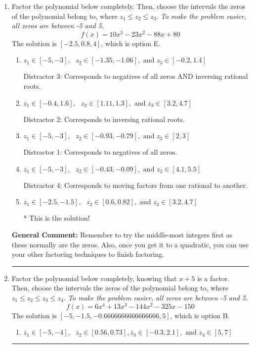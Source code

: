 \documentclass{extbook}[14pt]
\newcommand{\litem}[1]{\item #1

\rule{\textwidth}{0.4pt}}
\begin{document}
\begin{enumerate}\litem{
Factor the polynomial below completely. Then, choose the intervals the zeros of the polynomial belong to, where $z_1 \leq z_2 \leq z_3$. \textit{To make the problem easier, all zeros are between -5 and 5.}
\[ f(x) = 10x^{3} -23 x^{2} -88 x + 80 \]The solution is \( [-2.5, 0.8, 4] \), which is option E.\begin{enumerate}[label=\Alph*.]
\item \( z_1 \in [-5, -3], \text{   }  z_2 \in [-1.35, -1.06], \text{   and   } z_3 \in [-0.2, 1.4] \)

 Distractor 3: Corresponds to negatives of all zeros AND inversing rational roots.
\item \( z_1 \in [-0.4, 1.6], \text{   }  z_2 \in [1.11, 1.3], \text{   and   } z_3 \in [3.2, 4.7] \)

 Distractor 2: Corresponds to inversing rational roots.
\item \( z_1 \in [-5, -3], \text{   }  z_2 \in [-0.93, -0.79], \text{   and   } z_3 \in [2, 3] \)

 Distractor 1: Corresponds to negatives of all zeros.
\item \( z_1 \in [-5, -3], \text{   }  z_2 \in [-0.43, -0.09], \text{   and   } z_3 \in [4.1, 5.5] \)

 Distractor 4: Corresponds to moving factors from one rational to another.
\item \( z_1 \in [-2.5, -1.5], \text{   }  z_2 \in [0.6, 0.82], \text{   and   } z_3 \in [3.2, 4.7] \)

* This is the solution!
\end{enumerate}

\textbf{General Comment:} Remember to try the middle-most integers first as these normally are the zeros. Also, once you get it to a quadratic, you can use your other factoring techniques to finish factoring.
}
\litem{
Factor the polynomial below completely, knowing that $x+5$ is a factor. Then, choose the intervals the zeros of the polynomial belong to, where $z_1 \leq z_2 \leq z_3 \leq z_4$. \textit{To make the problem easier, all zeros are between -5 and 5.}
\[ f(x) = 6x^{4} +13 x^{3} -144 x^{2} -325 x -150 \]The solution is \( [-5, -1.5, -0.6666666666666666, 5] \), which is option B.\begin{enumerate}[label=\Alph*.]
\item \( z_1 \in [-5, -4], \text{   }  z_2 \in [0.56, 0.73], z_3 \in [-0.3, 2.1], \text{   and   } z_4 \in [5, 7] \)


\end{enumerate}}
\end{enumerate}
\end{document}
